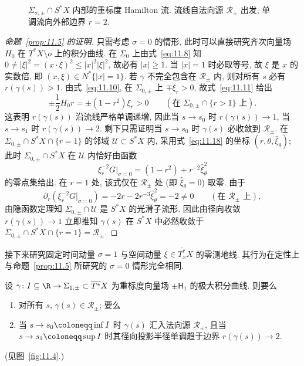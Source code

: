 \begin{figure}[htbp]
\centering
\drawFigElevenThree
\caption{$\Sigma_{\sigma, \pm} \cap S^* X$ 内部的重标度 Hamilton 流. 流线自法向源 $\mathcal{R}_\pm$ 出发, 单调流向外部边界 $r = 2$.}\label{fig:11.3}
\end{figure}

\begin{proof}[命题~\ref{prop:11.5} 的证明]
只需考虑 $\sigma = 0$ 的情形, 此时可以直接研究齐次向量场 $H_0$ 在 $T^* X \setminus o$ 上的积分曲线. 在 $\Sigma_0$ 上由式~\eqref{eq:11.8} 知 $0 \ne |\xi|^2 = (x \cdot \xi)^2 \le |x|^2 |\xi|^2$, 故必有 $|x| \ge 1$. 当 $|x| = 1$ 时必取等号, 故 $\xi$ 是 $x$ 的实数倍, 即 $(x, \xi) \in N^*\{|x| = 1\}$. 若 $\gamma$ 不完全包含在 $\mathcal{R}_\pm$ 内, 则对所有 $s$ 必有 $r(\gamma(s)) > 1$. 由式~\eqref{eq:11.10}, 在 $\Sigma_{0, \pm}$ 上 $\mp \xi_r > 0$, 故式~\eqref{eq:11.11} 给出
\[
    \pm \frac{1}{2} H_0 r = \pm(1 - r^2)\xi_r > 0 \qquad (\text{在 } \Sigma_{0, \pm} \cap \{r > 1\} \text{ 上}).
\]
这表明 $r(\gamma(s))$ 沿流线严格单调递增, 因此当 $s \to s_0$ 时 $r(\gamma(s)) \to 1$, 当 $s \to s_1$ 时 $r(\gamma(s)) \to 2$. 剩下只需证明当 $s \to s_0$ 时 $\gamma(s)$ 必收敛到 $\mathcal{R}_\pm$. 在 $\Sigma_{0, \pm} \cap S^* X \cap \{r = 1\}$ 的邻域 $\mathcal{U} \subset S^* X$ 内, 采用式~\eqref{eq:11.18} 的坐标 $(r, \theta, \hat{\xi}_\theta)$; 此时 $\Sigma_{0, \pm} \cap S^* X$ 在 $\mathcal{U}$ 内恰好由函数
\begin{equation}\label{eq:11.26}
    \xi_r^{-2} G|_{\sigma=0} = (1 - r^2) + r^{-2}\hat{\xi}_\theta^2
\end{equation}
的零点集给出. 在 $r = 1$ 处, 该式仅在 $\mathcal{R}_\pm$ 处 (即 $\hat{\xi}_\theta = 0$) 取零. 由于
\begin{equation}\label{eq:11.27}
    \partial_r(\xi_r^{-2} G|_{\sigma=0}) = -2r - 2r^{-3}\hat{\xi}_\theta^2 = -2 \ne 0 \qquad (\text{在 } \mathcal{R}_\pm \text{ 上}),
\end{equation}
由隐函数定理知 $\Sigma_{0, \pm} \cap \mathcal{U}$ 是 $S^* X$ 的光滑子流形. 因此由径向收敛 $r(\gamma(s)) \to 1$ 立即推知 $\gamma(s)$ 在 $S^* X$ 中必然收敛于 $\Sigma_{0, \pm} \cap S^* X \cap \{r = 1\} = \mathcal{R}_\pm$.
\end{proof}

接下来研究固定时间动量 $\sigma = 1$ 与空间动量 $\xi \in \overline{T_x^*} X$ 的零测地线. 其行为在定性上与命题~\ref{prop:11.5} 所研究的 $\sigma = 0$ 情形完全相同.

\begin{proposition}\label{prop:11.6}
设 $\gamma \colon I \subseteq \R \to \Sigma_{1, \pm} \subset \overline{T^*} X$ 为重标度向量场 $\pm \mathsf{H}_1$ 的极大积分曲线. 则要么
\begin{enumerate}[label=(\arabic*)]
    \item 对所有 $s$, $\gamma(s) \in \mathcal{R}_\pm$; 要么
    \item 当 $s \to s_0 \defeq \inf I$ 时 $\gamma(s)$ 汇入法向源 $\mathcal{R}_\pm$, 且当 $s \to s_1 \defeq \sup I$ 时其径向投影半径单调趋于边界 $r(\gamma(s)) \to 2$.
\end{enumerate}
(见图~\ref{fig:11.4}.)
\end{proposition}

